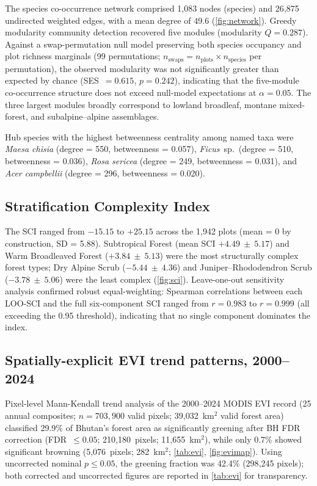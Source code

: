 \documentclass[review,12pt,a4paper]{elsarticle}
\begin{document}
The species co-occurrence network comprised 1{,}083 nodes (species) and
26{,}875 undirected weighted edges, with a mean degree of 49.6
(\cref{fig:network}). Greedy modularity community detection recovered five
modules (modularity $Q = 0.287$). Against a swap-permutation null model
preserving both species occupancy and plot richness marginals
(99 permutations; $n_{\text{swaps}} = n_{\text{plots}} \times n_{\text{species}}$
per permutation), the observed modularity was not significantly greater than
expected by chance (SES~$= 0.615$, $p = 0.242$), indicating that the
five-module co-occurrence structure does not exceed null-model expectations
at $\alpha = 0.05$. The three largest modules broadly correspond to lowland
broadleaf, montane mixed-forest, and subalpine--alpine assemblages.

Hub species with the highest betweenness centrality among named taxa were
\textit{Maesa chisia} (degree = 550, betweenness = 0.057),
\textit{Ficus}~sp.\ (degree = 510, betweenness = 0.036),
\textit{Rosa sericea} (degree = 249, betweenness = 0.031), and
\textit{Acer campbellii} (degree = 296, betweenness = 0.020).

\subsection{Stratification Complexity Index}
\label{sec:res_sci}

The SCI ranged from $-15.15$ to $+25.15$ across the 1{,}942 plots
(mean = 0 by construction, SD = 5.88). Subtropical Forest
(mean SCI $+4.49~\pm~5.17$) and Warm Broadleaved Forest ($+3.84~\pm~5.13$)
were the most structurally complex forest types; Dry Alpine Scrub
($-5.44~\pm~4.36$) and Juniper--Rhododendron Scrub ($-3.78~\pm~5.06$) were
the least complex (\cref{fig:sci}). Leave-one-out sensitivity analysis
confirmed robust equal-weighting: Spearman correlations between each LOO-SCI
and the full six-component SCI ranged from $r = 0.983$ to $r = 0.999$
(all exceeding the 0.95 threshold), indicating that no single component
dominates the index.

\subsection{Spatially-explicit EVI trend patterns, 2000--2024}
\label{sec:res_evi}

Pixel-level Mann-Kendall trend analysis of the 2000--2024 MODIS EVI record
(25 annual composites; $n = 703{,}900$ valid pixels; 39{,}032~km$^2$ valid
forest area) classified 29.9\% of Bhutan's forest area as significantly
greening after BH FDR correction
(FDR~$\leq 0.05$; 210{,}180~pixels; 11{,}655~km$^2$), while only 0.7\% showed
significant browning (5{,}076~pixels; 282~km$^2$; \cref{tab:evi}, \cref{fig:evimap}).
Using uncorrected nominal $p \leq 0.05$, the greening fraction was 42.4\%
(298{,}245 pixels); both corrected and uncorrected figures are reported in
\cref{tab:evi} for transparency.
\end{document}
